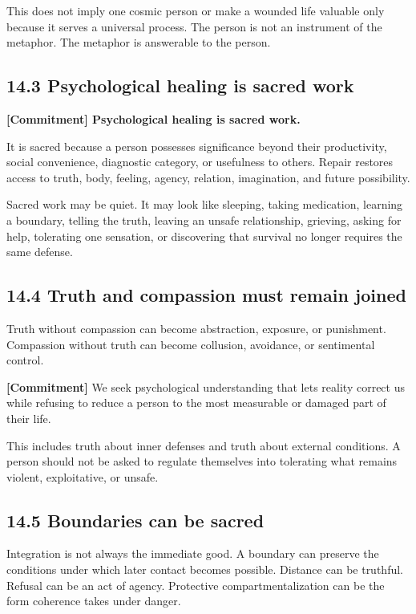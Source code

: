 \documentclass[
  11pt,
]{article}
\begin{document}
This does not imply one cosmic person or make a wounded life valuable
only because it serves a universal process. The person is not an
instrument of the metaphor. The metaphor is answerable to the person.

\subsection{14.3 Psychological healing is sacred
work}\label{psychological-healing-is-sacred-work}

\textbf{{[}Commitment{]} Psychological healing is sacred work.}

It is sacred because a person possesses significance beyond their
productivity, social convenience, diagnostic category, or usefulness to
others. Repair restores access to truth, body, feeling, agency,
relation, imagination, and future possibility.

Sacred work may be quiet. It may look like sleeping, taking medication,
learning a boundary, telling the truth, leaving an unsafe relationship,
grieving, asking for help, tolerating one sensation, or discovering that
survival no longer requires the same defense.

\subsection{14.4 Truth and compassion must remain
joined}\label{truth-and-compassion-must-remain-joined}

Truth without compassion can become abstraction, exposure, or
punishment. Compassion without truth can become collusion, avoidance, or
sentimental control.

\textbf{{[}Commitment{]}} We seek psychological understanding that lets
reality correct us while refusing to reduce a person to the most
measurable or damaged part of their life.

This includes truth about inner defenses and truth about external
conditions. A person should not be asked to regulate themselves into
tolerating what remains violent, exploitative, or unsafe.

\subsection{14.5 Boundaries can be
sacred}\label{boundaries-can-be-sacred}

Integration is not always the immediate good. A boundary can preserve
the conditions under which later contact becomes possible. Distance can
be truthful. Refusal can be an act of agency. Protective
compartmentalization can be the form coherence takes under danger.
\end{document}
